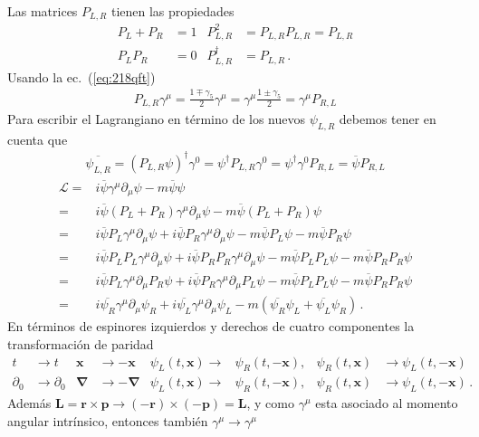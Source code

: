 Las matrices $P_{L,R}$ tienen las propiedades
\begin{align}
  P_L+P_R&=1 & P_{L,R}^2&=P_{L,R}P_{L,R}=P_{L,R}\nonumber\\
  P_L P_R&=0& P_{L,R}^\dagger&=P_{L,R}\,.
\end{align}
Usando la ec.~(\ref{eq:218qft})
\begin{align}
  P_{L,R}\gamma^\mu=\frac{1\mp\gamma_5}{2}\gamma^\mu=\gamma^\mu\frac{1\pm\gamma_5}{2}=\gamma^\mu P_{R,L}
\end{align}
Para escribir el Lagrangiano en término de los nuevos $\psi_{L,R}$ debemos tener en cuenta que
\begin{align}
  \overline{\psi_{L,R}}=(P_{L,R}\psi)^\dagger\gamma^0=\psi^\dagger P_{L,R}\gamma^0=\psi^\dagger\gamma^0P_{R,L}=\overline{\psi}P_{R,L}
\end{align}
\begin{align}
  \label{eq:221qft}
  \mathcal{L}=&i\overline{\psi}\gamma^\mu\partial_\mu\psi-m\overline{\psi}\psi\nonumber\\
  =&i\overline{\psi}(P_L+P_R)\gamma^\mu\partial_\mu\psi-m\overline{\psi}(P_L+P_R)\psi\nonumber\\
  =&i\overline{\psi}P_L\gamma^\mu\partial_\mu\psi+i\overline{\psi}P_R\gamma^\mu\partial_\mu\psi-m\overline{\psi}P_L\psi-m\overline{\psi}P_R\psi\nonumber\\
  =&i\overline{\psi}P_L P_L\gamma^\mu\partial_\mu\psi+i\overline{\psi}P_R P_R\gamma^\mu\partial_\mu\psi-m\overline{\psi}P_L P_L\psi-m\overline{\psi}P_R P_R\psi\nonumber\\
  =&i\overline{\psi}P_L\gamma^\mu\partial_\mu P_R\psi+i\overline{\psi}P_R\gamma^\mu\partial_\mu P_L\psi-m\overline{\psi}P_L P_L\psi-m\overline{\psi}P_R P_R\psi\nonumber\\
  =&i\overline{\psi_R}\gamma^\mu\partial_\mu\psi_R+i\overline{\psi_L}\gamma^\mu\partial_\mu\psi_L-m(\overline{\psi_R}\psi_L+\overline{\psi_L}\psi_R)\,.
\end{align}
En términos de espinores izquierdos y derechos de cuatro componentes la transformación de paridad 
\begin{align}
  \label{eq:220qft}
  t&\to t&\mathbf{x}&\to -\mathbf{x}&\psi_L(t,\mathbf{x})\to&\psi_R(t,-\mathbf{x}),& \psi_R(t,\mathbf{x})&\to\psi_L(t,-\mathbf{x})\nonumber\\
  \partial_0&\to \partial_0&\boldsymbol{\nabla}&\to -\boldsymbol{\nabla}&\psi_L(t,\mathbf{x})\to&\psi_R(t,-\mathbf{x}),& \psi_R(t,\mathbf{x})&\to\psi_L(t,-\mathbf{x})\,.
\end{align}
Además $\mathbf{L}=\mathbf{r}\times \mathbf{p}\to(-\mathbf{r})\times (-\mathbf{p})=\mathbf{L}$, y como $\gamma^\mu$ esta asociado al momento angular intrínsico, entonces también $\gamma^\mu\to\gamma^\mu$


